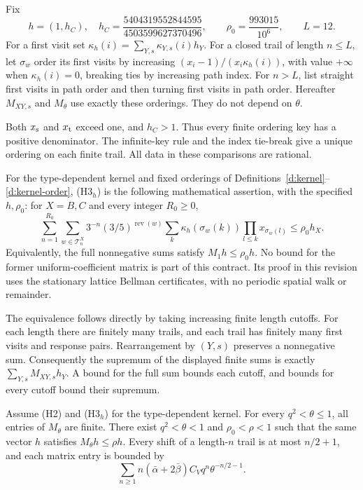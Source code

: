 \begin{definition}\label{d:kernel-order}
Fix
\[
 h=(1,h_C),\quad h_C=\frac{5404319552844595}{4503599627370496},
 \qquad \rho_0=\frac{993015}{10^6},\qquad L=12 .
\]
For a first visit set \(\kappa_h(i)=\sum_{Y,s}\kappa_{Y,s}(i)h_Y\).
For a closed trail of length \(n\le L\), let \(\sigma_w\) order its
first visits by increasing
\((x_i-1)/(x_i\kappa_h(i))\), with value \(+\infty\) when
\(\kappa_h(i)=0\), breaking ties by increasing path index.
For \(n>L\), list straight first visits in path order and then
turning first visits in path order.
Hereafter \(M_{XY,s}\) and \(M_\theta\) use exactly these orderings.
They do not depend on \(\theta\).
\end{definition}

Both \(x_{\rm s}\) and \(x_{\rm t}\) exceed one, and \(h_C>1\).
Thus every finite ordering key has a positive denominator.  The
infinite-key rule and the index tie-break give a unique ordering on
each finite trail.  All data in these comparisons are rational.

\begin{definition}[(H3\(_h\))]\label{h:H3}
For the type-dependent kernel and fixed orderings of
Definitions~\ref{d:kernel}--\ref{d:kernel-order}, (H3\(_h\)) is the
following mathematical assertion, with the specified \(h,\rho_0\):
for \(X=B,C\) and every integer \(R_0\ge0\),
\[
 \sum_{n=1}^{R_0}\sum_{w\in\mathcal T_n^X}
 3^{-n}(3/5)^{\operatorname{rev}(w)}
 \sum_k\kappa_h(\sigma_w(k))\prod_{l\le k}x_{\sigma_w(l)}
       \le\rho_0h_X .
\]
Equivalently, the full nonnegative sums satisfy \(M_1h\le\rho_0h\).
No bound for the former uniform-coefficient matrix is part of this
contract. Its proof in this revision uses the stationary lattice
Bellman certificates, with no periodic spatial walk or remainder.
\end{definition}

The equivalence follows directly by taking increasing finite
length cutoffs.  For each length there are finitely many trails,
and each trail has finitely many first visits and response pairs.
Rearrangement by \((Y,s)\) preserves a nonnegative sum.  Consequently
the supremum of the displayed finite sums is exactly
\(\sum_{Y,s}M_{XY,s}h_Y\).  A bound for the full sum bounds each
cutoff, and bounds for every cutoff bound their supremum.

\begin{lemma}\label{l:Mtheta}
Assume (H2) and (H3\(_h\)) for the type-dependent kernel.
For every \(q^2<\theta\le1\), all entries of \(M_\theta\) are
finite. There exist \(q^2<\theta<1\) and \(\rho_0<\rho<1\)
such that the same vector \(h\) satisfies \(M_\theta h\le\rho h\).
Every shift of a length-\(n\) trail is at most \(n/2+1\), and
each matrix entry is bounded by
\[
 \sum_{n\ge1} n(\bar\alpha+2\bar\beta)
                      C_V q^n\theta^{-n/2-1}.
\]
\end{lemma}

